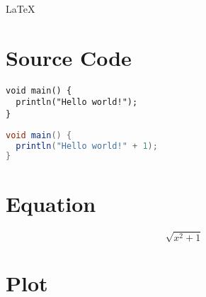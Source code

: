\documentclass[a4paper]{germanarticle}
\begin{document}
\Huge\LaTeX\normalsize

\blinddocument

\section{Source Code}
  \begin{verbatim}
void main() {
  println("Hello world!");
}
  \end{verbatim}
  \begin{lstlisting}[language=Java]
void main() {
  println("Hello world!" + 1);
}
  \end{lstlisting}

\section{Equation}
  \begin{equation*}
    \sqrt{x^2+1}
  \end{equation*}

\section{Plot}
\end{document}
